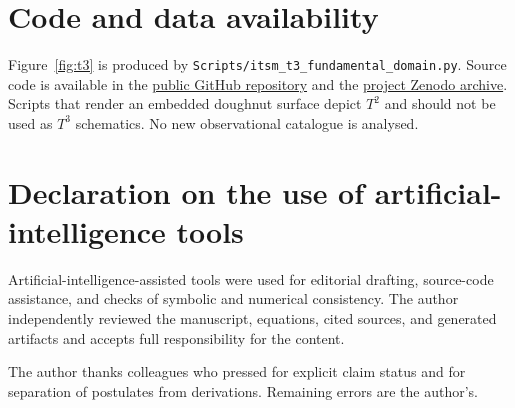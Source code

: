 \documentclass[aps,prd,reprint,superscriptaddress,nofootinbib,floatfix,showkeys]{revtex4-2}
\newcommand{\Tthree}{T^{3}}
\newcommand{\Ttwo}{T^{2}}
\begin{document}
\section*{Code and data availability}

\begingroup
\raggedright
Figure~\ref{fig:t3} is produced by
\texttt{Scripts/itsm\_t3\_fundamental\_domain.py}.
Source code is available in the
\href{https://github.com/brendohxd/ITSM-Integrated-Toroidal-Syntropic-Model}{public GitHub repository}
and the \href{https://doi.org/10.5281/zenodo.18808348}{project Zenodo archive}.
Scripts that render an embedded doughnut surface depict \(\Ttwo\) and should
not be used as \(\Tthree\) schematics.  No new observational catalogue is
analysed.
\par
\endgroup

\section*{Declaration on the use of artificial-intelligence tools}

Artificial-intelligence-assisted tools were used for editorial drafting,
source-code assistance, and checks of symbolic and numerical consistency.
The author independently reviewed the manuscript, equations, cited sources,
and generated artifacts and accepts full responsibility for the content.

\begin{acknowledgments}
The author thanks colleagues who pressed for explicit claim status and for
separation of postulates from derivations.  Remaining errors are the author's.
\end{acknowledgments}


\end{document}
